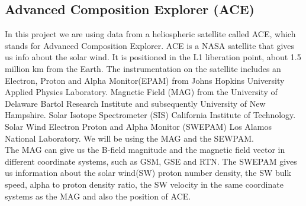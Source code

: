 \documentclass[norsk,a4paper,12pt]{article}
\begin{document}
\begin{multicols}{2}
\subsection{Advanced Composition Explorer (ACE)} %
\label{sub:ACE}
	In this project we are using data from a heliospheric satellite called ACE, which stands for Advanced Composition Explorer. ACE is a NASA satellite that gives us info about the solar wind. It is positioned in the L1 liberation point, about 1.5 million km from the Earth. The instrumentation on the satellite includes an Electron, Proton and Alpha Monitor(EPAM) from Johns Hopkins University Applied Physics Laboratory. Magnetic Field (MAG) from the University of Delaware Bartol Research Institute and subsequently University of New Hampshire. Solar Isotope Spectrometer (SIS) California Institute of Technology. Solar Wind Electron Proton and Alpha Monitor (SWEPAM) Los Alamos National Laboratory. We will be using the MAG and the SEWPAM. \\

	The MAG can give us the B-field magnitude and the magnetic field vector in different coordinate systems, such as GSM, GSE and RTN. The SWEPAM gives us information about the solar wind(SW) proton number density, the SW bulk speed, alpha to proton density ratio, the SW velocity in the same coordinate systems as the MAG and also the position of ACE.


\end{multicols}
\end{document}
